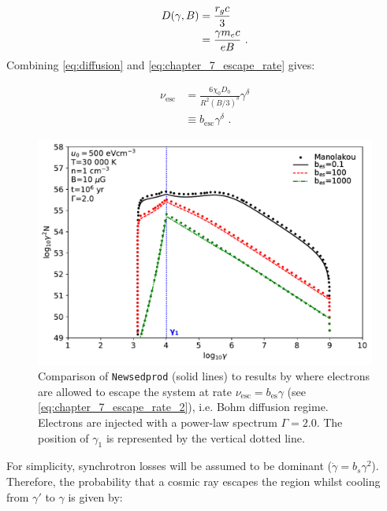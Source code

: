 \begin{equation}
    \begin{aligned}
    D\qty(\gamma,B)&=\frac{r_gc}{3} \\
    &=\frac{\gamma m_e c}{e B}\text{ .}
    \end{aligned}
\end{equation}
\noindent Combining \autoref{eq:diffusion} and \autoref{eq:chapter_7_escape_rate} gives:

\begin{equation}
    \begin{aligned}
    \nu_\text{esc}&=\frac{6\chi_0D_0}{R^2 (B/3)^\delta} \gamma^\delta \\
    &\equiv b_\text{esc} \gamma^\delta\text{ .}
    \end{aligned} \label{eq:chapter_7_escape_rate_2}
\end{equation}

\begin{figure}[htbt]
    \centering
    \includegraphics[width=\textwidth]{07_Particle_Evolution/Images/Code/manolakou_ecape.pdf}
    \caption{Comparison of {\tt Newsedprod} (solid lines) to results by \cite{2007A&A...474..689M} where electrons are allowed to escape the system at rate $\nu_\text{esc}= b_\text{es}\gamma$ (see \autoref{eq:chapter_7_escape_rate_2}), i.e. Bohm diffusion regime. Electrons are injected with a power-law spectrum $\Gamma=2.0$. The position of $\gamma_1$ is represented by the vertical dotted line.}
    \label{fig:chapter_7_manolakou_escape}
\end{figure}

For simplicity, synchrotron losses will be assumed to be dominant ($\dot{\gamma}=b_s\gamma^2$). Therefore, the probability that a cosmic ray escapes the region whilst cooling from $\gamma'$ to $\gamma$ is given by:

